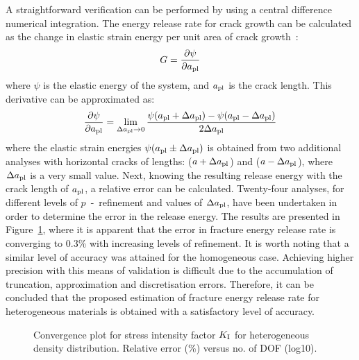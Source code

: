 \documentclass[onecolumn]{svjour3}
\begin{document}
A straightforward verification can be performed by using a central difference numerical integration. The energy release rate for crack growth can be calculated as the change in elastic strain energy per unit area of crack growth~\cite{Griffith163}:
\begin{equation}
G = \frac{\partial \psi}{\partial a_{\rm {pl}}}
\end{equation}
where $\psi$ is the elastic energy of the system, and $a_{\rm{pl}}$ is the crack length. This derivative can be approximated as:
\begin{equation}
 \frac{\partial \psi}{\partial a_{\rm {pl}}} = \lim_{\Delta a_{\rm {pl}} \to 0} \frac{\psi(a_{\rm {pl}} + \Delta a_{\rm {pl}}) - \psi(a_{\rm {pl}} -\Delta a_{\rm {pl}})}{2\Delta a_{\rm {pl}}}
\end{equation}
where the elastic strain energies $\psi(a_{\rm {pl}} \pm \Delta a_{\rm {pl}})$ is obtained from two additional analyses with horizontal cracks of lengths: ($a + \Delta a_{\rm {pl}}$) and ($a - \Delta a_{\rm {pl}}$), where $\Delta a_{\rm {pl}}$ is a very small value. 
Next, knowing the resulting release energy with the crack length of $a_{\rm {pl}}$, a relative error can be calculated. 
Twenty-four analyses, for different levels of $p$~-~refinement and values of $\Delta a_{\rm {pl}}$, have been undertaken in order to determine the error in the release energy. 
The results are presented in Figure~\ref{fig:covergencefdm}, where it is apparent that the error in fracture energy release rate is converging to 0.3\% 
with increasing levels of refinement. It is worth noting that a similar level of accuracy was attained for the homogeneous case.  Achieving higher precision with this means of validation is difficult due to the accumulation of truncation, approximation and discretisation errors.
Therefore, it can be concluded that the proposed estimation of fracture energy release rate for heterogeneous materials is obtained with a satisfactory level of accuracy.
\begin{figure}[h]
	\centering
	\caption{Convergence plot for stress intensity factor $K_{\rm I}$ for heterogeneous density distribution. Relative error (\%) versus no. of DOF (log10).}
	\label{fig:covergencefdm}
\end{figure}
\end{document}

